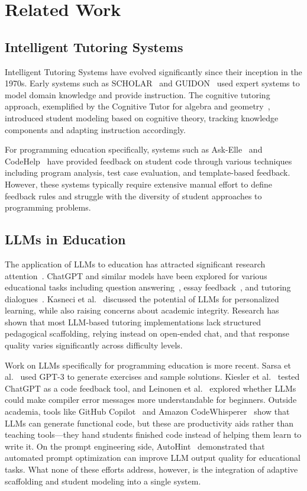 \documentclass[applsci,article,submit,pdftex,moreauthors]{Definitions/mdpi}
\begin{document}
\section{Related Work}

\subsection{Intelligent Tutoring Systems}

Intelligent Tutoring Systems have evolved significantly since their inception in the 1970s. Early systems such as SCHOLAR~\cite{ref9} and GUIDON~\cite{ref10} used expert systems to model domain knowledge and provide instruction. The cognitive tutoring approach, exemplified by the Cognitive Tutor for algebra and geometry~\cite{ref11}, introduced student modeling based on cognitive theory, tracking knowledge components and adapting instruction accordingly.

For programming education specifically, systems such as Ask-Elle~\cite{ref12} and CodeHelp~\cite{ref13} have provided feedback on student code through various techniques including program analysis, test case evaluation, and template-based feedback. However, these systems typically require extensive manual effort to define feedback rules and struggle with the diversity of student approaches to programming problems.

\subsection{LLMs in Education}

The application of LLMs to education has attracted significant research attention~\cite{ref14}. ChatGPT and similar models have been explored for various educational tasks including question answering~\cite{ref15}, essay feedback~\cite{ref16}, and tutoring dialogues~\cite{ref17}. Kasneci et al.~\cite{ref5} discussed the potential of LLMs for personalized learning, while also raising concerns about academic integrity. Research has shown that most LLM-based tutoring implementations lack structured pedagogical scaffolding, relying instead on open-ended chat, and that response quality varies significantly across difficulty levels.

Work on LLMs specifically for programming education is more recent. Sarsa et al.~\cite{ref18} used GPT-3 to generate exercises and sample solutions. Kiesler et al.~\cite{ref19} tested ChatGPT as a code feedback tool, and Leinonen et al.~\cite{ref20} explored whether LLMs could make compiler error messages more understandable for beginners. Outside academia, tools like GitHub Copilot~\cite{ref21} and Amazon CodeWhisperer~\cite{ref22} show that LLMs can generate functional code, but these are productivity aids rather than teaching tools---they hand students finished code instead of helping them learn to write it. On the prompt engineering side, AutoHint~\cite{ref23} demonstrated that automated prompt optimization can improve LLM output quality for educational tasks. What none of these efforts address, however, is the integration of adaptive scaffolding and student modeling into a single system.
\end{document}
